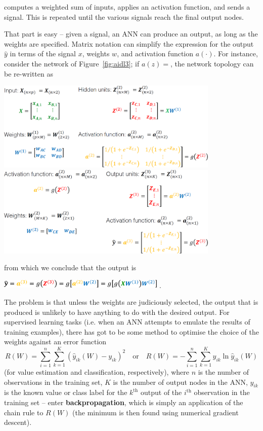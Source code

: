 computes a weighted sum of inputs, applies an activation function, and sends a signal. This is repeated until the various signals reach the final output nodes.\par That part is easy -- given a signal, an ANN can produce an output, as long as the weights are specified. Matrix notation can simplify the expression for the output $\hat{y}$ in terms of the signal $x$, weights $w$, and activation function $a(\cdot)$. For instance, consider the network of Figure~\ref{fig:aidl3}; if $a(z)=$, the network topology can be re-written as  
\begin{center}
\includegraphics[width=0.8\textwidth]{images/DSML/inputtohidden.png}\\[0.3cm]
\includegraphics[width=0.8\textwidth]{images/DSML/hiddenttooutput.png}
\end{center}
from which we conclude that the output is 
\begin{center}
\includegraphics[width=0.6\textwidth]{images/DSML/output.png} .
\end{center}
The problem is that unless the weights are judiciously selected, the output that is produced is unlikely to have anything to do with the desired output. For supervised learning tasks (i.e. when an ANN attempts to emulate the results of training examples), there has got to be some method to optimise the choice of the weights against an error function $$R(W)=\sum_{i=1}^n\sum_{k=1}^K\left(\hat{y}_{ik}(W)-y_{ik}\right)^2\quad\mbox{or}\quad R(W)=-\sum_{i=1}^n\sum_{k=1}^Ky_{ik}\ln \hat{y}_{ik}(W)$$ (for value estimation and classification, respectively), where $n$ is the number of observations in the training set, $K$ is the number of output nodes in the ANN, $y_{ik}$ is the known value or class label for the $k^{\textrm{th}}$ output of the $i^{\textrm{th}}$ observation in the training set -- enter \textbf{backpropagation}, which is simply an application of the chain rule to $R(W)$ (the minimum is then found using numerical gradient descent). 
